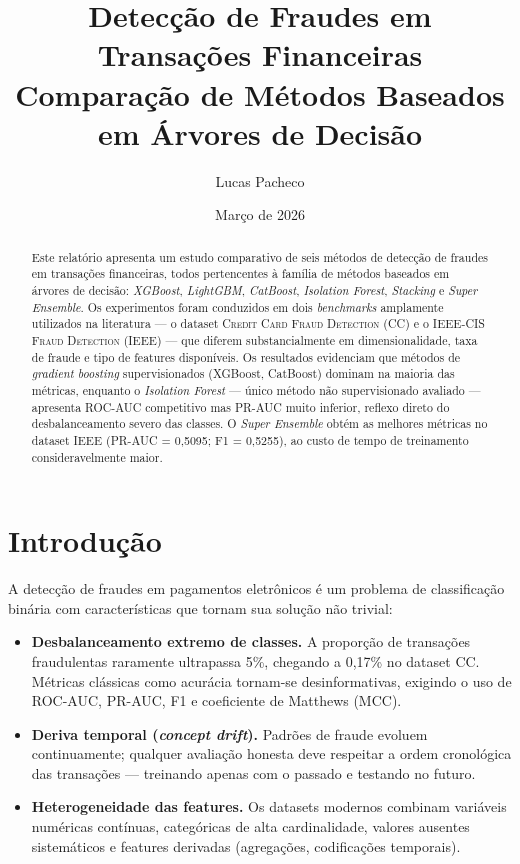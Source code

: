 \documentclass[12pt,a4paper]{article}
\title{%
  \textbf{Detecção de Fraudes em Transações Financeiras}\\[6pt]
  \large Comparação de Métodos Baseados em Árvores de Decisão
}
\author{Lucas Pacheco}
\date{Março de 2026}
\newcommand{\dataset}[1]{\textsc{#1}}
\newcommand{\algo}[1]{\textit{#1}}
\begin{document}
\maketitle
\tableofcontents
\newpage

\begin{abstract}
Este relatório apresenta um estudo comparativo de seis métodos de detecção de
fraudes em transações financeiras, todos pertencentes à família de métodos
baseados em árvores de decisão: \algo{XGBoost}, \algo{LightGBM},
\algo{CatBoost}, \algo{Isolation Forest}, \algo{Stacking} e
\algo{Super Ensemble}. Os experimentos foram conduzidos em dois \textit{benchmarks}
amplamente utilizados na literatura — o dataset \dataset{Credit Card Fraud
Detection} (CC) e o \dataset{IEEE-CIS Fraud Detection} (IEEE) — que diferem
substancialmente em dimensionalidade, taxa de fraude e tipo de features
disponíveis. Os resultados evidenciam que métodos de \textit{gradient boosting}
supervisionados (XGBoost, CatBoost) dominam na maioria das métricas, enquanto
o \algo{Isolation Forest} — único método não supervisionado avaliado — apresenta
ROC-AUC competitivo mas PR-AUC muito inferior, reflexo direto do desbalanceamento
severo das classes. O \algo{Super Ensemble} obtém as melhores métricas no
dataset IEEE (PR-AUC = 0{,}5095; F1 = 0{,}5255), ao custo de tempo de
treinamento consideravelmente maior.
\end{abstract}

\section{Introdução}
\label{sec:intro}

A detecção de fraudes em pagamentos eletrônicos é um problema de classificação
binária com características que tornam sua solução não trivial:

\begin{itemize}[nosep]
  \item \textbf{Desbalanceamento extremo de classes.} A proporção de transações
    fraudulentas raramente ultrapassa 5\%, chegando a 0{,}17\% no dataset CC.
    Métricas clássicas como acurácia tornam-se desinformativas, exigindo o uso
    de ROC-AUC, PR-AUC, F1 e coeficiente de Matthews (MCC).

  \item \textbf{Deriva temporal (\textit{concept drift}).} Padrões de fraude
    evoluem continuamente; qualquer avaliação honesta deve respeitar a ordem
    cronológica das transações — treinando apenas com o passado e testando no
    futuro.

  \item \textbf{Heterogeneidade das features.} Os datasets modernos combinam
    variáveis numéricas contínuas, categóricas de alta cardinalidade, valores
    ausentes sistemáticos e features derivadas (agregações, codificações
    temporais).
\end{itemize}
\end{document}
